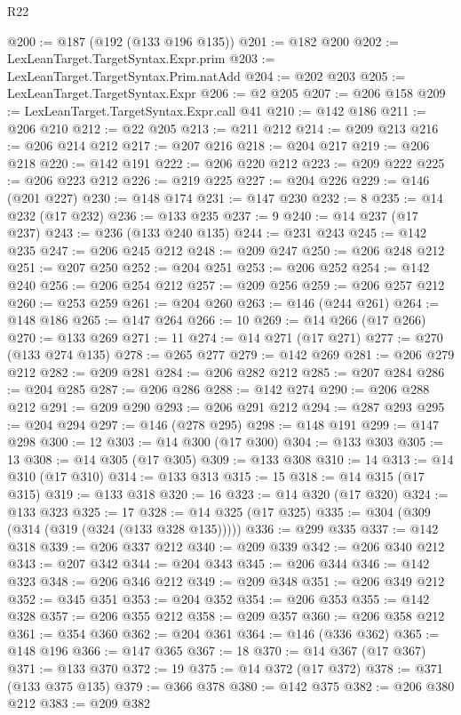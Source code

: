 \begin{lexlean}{R22}
\begin{coremodule}
@200 := @187 (@192 (@133 @196 @135))
@201 := @182 @200
@202 := LexLeanTarget.TargetSyntax.Expr.prim
@203 := LexLeanTarget.TargetSyntax.Prim.natAdd
@204 := @202 @203
@205 := LexLeanTarget.TargetSyntax.Expr
@206 := @2 @205
@207 := @206 @158
@209 := LexLeanTarget.TargetSyntax.Expr.call @41
@210 := @142 @186
@211 := @206 @210
@212 := @22 @205
@213 := @211 @212
@214 := @209 @213
@216 := @206 @214 @212
@217 := @207 @216
@218 := @204 @217
@219 := @206 @218
@220 := @142 @191
@222 := @206 @220 @212
@223 := @209 @222
@225 := @206 @223 @212
@226 := @219 @225
@227 := @204 @226
@229 := @146 (@201 @227)
@230 := @148 @174
@231 := @147 @230
@232 := 8
@235 := @14 @232 (@17 @232)
@236 := @133 @235
@237 := 9
@240 := @14 @237 (@17 @237)
@243 := @236 (@133 @240 @135)
@244 := @231 @243
@245 := @142 @235
@247 := @206 @245 @212
@248 := @209 @247
@250 := @206 @248 @212
@251 := @207 @250
@252 := @204 @251
@253 := @206 @252
@254 := @142 @240
@256 := @206 @254 @212
@257 := @209 @256
@259 := @206 @257 @212
@260 := @253 @259
@261 := @204 @260
@263 := @146 (@244 @261)
@264 := @148 @186
@265 := @147 @264
@266 := 10
@269 := @14 @266 (@17 @266)
@270 := @133 @269
@271 := 11
@274 := @14 @271 (@17 @271)
@277 := @270 (@133 @274 @135)
@278 := @265 @277
@279 := @142 @269
@281 := @206 @279 @212
@282 := @209 @281
@284 := @206 @282 @212
@285 := @207 @284
@286 := @204 @285
@287 := @206 @286
@288 := @142 @274
@290 := @206 @288 @212
@291 := @209 @290
@293 := @206 @291 @212
@294 := @287 @293
@295 := @204 @294
@297 := @146 (@278 @295)
@298 := @148 @191
@299 := @147 @298
@300 := 12
@303 := @14 @300 (@17 @300)
@304 := @133 @303
@305 := 13
@308 := @14 @305 (@17 @305)
@309 := @133 @308
@310 := 14
@313 := @14 @310 (@17 @310)
@314 := @133 @313
@315 := 15
@318 := @14 @315 (@17 @315)
@319 := @133 @318
@320 := 16
@323 := @14 @320 (@17 @320)
@324 := @133 @323
@325 := 17
@328 := @14 @325 (@17 @325)
@335 := @304 (@309 (@314 (@319 (@324 (@133 @328 @135)))))
@336 := @299 @335
@337 := @142 @318
@339 := @206 @337 @212
@340 := @209 @339
@342 := @206 @340 @212
@343 := @207 @342
@344 := @204 @343
@345 := @206 @344
@346 := @142 @323
@348 := @206 @346 @212
@349 := @209 @348
@351 := @206 @349 @212
@352 := @345 @351
@353 := @204 @352
@354 := @206 @353
@355 := @142 @328
@357 := @206 @355 @212
@358 := @209 @357
@360 := @206 @358 @212
@361 := @354 @360
@362 := @204 @361
@364 := @146 (@336 @362)
@365 := @148 @196
@366 := @147 @365
@367 := 18
@370 := @14 @367 (@17 @367)
@371 := @133 @370
@372 := 19
@375 := @14 @372 (@17 @372)
@378 := @371 (@133 @375 @135)
@379 := @366 @378
@380 := @142 @375
@382 := @206 @380 @212
@383 := @209 @382

\end{coremodule}
\end{lexlean}
